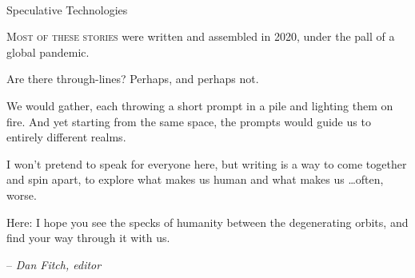 \pagestyle{plain}

\begingroup%
\centering
\vspace*{24pt}
{\HUGE {}}\\[\baselineskip]
{\Huge \tubefont Speculative Technologies}\\[\baselineskip]
\vfill\null
\endgroup



\renewcommand{\contentsname}{}

{\setlength{\beforechapskip}{0pt}
\begin{KeepFromToc}
  \tableofcontents*
\end{KeepFromToc}
}

\vfill
\specsep{}

\lettrine{M}{ost of these stories} were written and assembled in 2020, under the pall of a global pandemic.

Are there through-lines? Perhaps, and perhaps not.

We would gather, each throwing a short prompt in a pile and lighting them on fire. And yet starting from the same space, the prompts would guide us to entirely different realms.

I won't pretend to speak for everyone here, but writing is a way to come together and spin apart, to explore what makes us human and what makes us \ldots often, worse.

Here: I hope you see the specks of humanity between the degenerating orbits, and find your way through it with us.

\vspace{1em}

\hfill-- \emph{Dan Fitch, editor}


\clearpage

